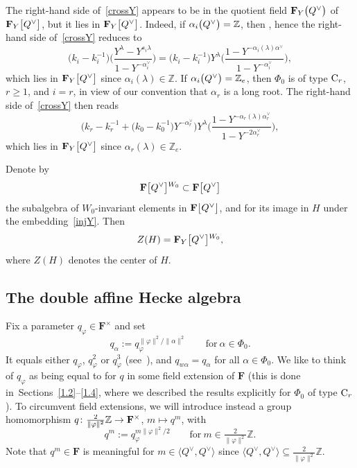 \documentclass[pdftex]{sigma}
\numberwithin{equation}{section}
\begin{document}
The right-hand side of~\eqref{crossY} appears to be in the quotient field $\mathbf{F}_Y\smash{\bigl(Q^\vee\bigr)}$ of $\mathbf{F}_Y\smash{\bigl[Q^\vee\bigr]}$, but it lies
in $\mathbf{F}_Y\smash{\bigl[Q^\vee\bigr]}$. Indeed, if $\alpha_i\smash{\bigl(Q^\vee\bigr)}=\mathbb{Z}$, then
, hence the right-hand side of~\eqref{crossY} reduces to
\[
\bigl(k_i-k_i^{-1}\bigr)\biggl(\frac{Y^\lambda-Y^{s_i\lambda}}{1-Y^{-\alpha_i^\vee}}\biggr)=
\bigl(k_i-k_i^{-1}\bigr)Y^\lambda\biggl(\frac{1-Y^{-\alpha_i(\lambda)\alpha^\vee}}{1-Y^{-\alpha_i^\vee}}\biggr),
\]
which lies in $\mathbf{F}_Y\smash{\bigl[Q^\vee\bigr]}$ since $\alpha_i(\lambda)\in\mathbb{Z}$. If $\alpha_i\smash{\bigl(Q^\vee\bigr)}=\mathbb{Z}_e$, then $\Phi_0$ is of type ${\rm C}_r$, $r\geq 1$,
and $i=r$, in view of our convention that $\alpha_r$ is a long root.
The right-hand side of~\eqref{crossY} then reads
\[
\bigl(k_r-k_r^{-1}+\bigl(k_0-k_0^{-1}\bigr)Y^{-\alpha_r^\vee}\bigr)Y^\lambda\biggl(\frac{1-Y^{-\alpha_r(\lambda)\alpha_r^\vee}}{1-Y^{-2\alpha_r^\vee}}\biggr),
\]
which lies in $\mathbf{F}_Y\smash{\bigl[Q^\vee\bigr]}$ since $\alpha_r(\lambda)\in \mathbb{Z}_e$.

Denote by
\[
\mathbf{F}\smash{\bigl[Q^\vee\bigr]}^{W_0}\subset\mathbf{F}\smash{\bigl[Q^\vee\bigr]}
\]
the subalgebra of $W_0$-invariant elements in $\mathbf{F}\smash{\bigl[Q^\vee\bigr]}$, and  for its image in $H$ under the embedding~\eqref{injY}. Then
\[
Z(H)=\mathbf{F}_Y\smash{\bigl[Q^\vee\bigr]}^{W_0},
\]
where $Z(H)$ denotes the center of $H$.

\subsection{The double affine Hecke algebra}\label{2.5}
Fix a parameter $q_\varphi\in\mathbf{F}^\times$ and set
\[
q_\alpha:=q_\varphi^{\|\varphi\|^2/\|\alpha\|^2}\qquad \text{for}\ \alpha\in\Phi_0.
\]
It equals either $q_\varphi$, $q_\varphi^2$ or $q_\varphi^3$ (see~\cite[Section~9.4, Table~1]{Hu}), and $q_{w\alpha}=q_\alpha$ for all $\alpha\in\Phi_0$.
We like to think of $q_\varphi$ as being equal to  for $q$ in some field extension of $\mathbf{F}$ (this is done in~Sections~\ref{1.2}--\ref{1.4}, where we described the results explicitly for $\Phi_0$ of type ${\rm C}_r$).
To circumvent field extensions, we will introduce instead a group homomorphism $q\colon \smash{\frac{2}{\|\varphi\|^2}}\mathbb{Z}\rightarrow\mathbf{F}^\times$, $m\mapsto q^m$, with
\begin{equation*}%
q^{m}:=q_\varphi^{m\|\varphi\|^2/2}\qquad \text{for}\ m\in\tfrac{2}{\|\varphi\|^2}\mathbb{Z}.
\end{equation*}
Note that $q^m\in\mathbf{F}$ is meaningful for $m\in \bigl\langle Q^\vee, Q^\vee\bigr\rangle$ since
$\bigl\langle Q^\vee, Q^\vee\bigr\rangle\subseteq\frac{2}{\|\varphi\|^2}\mathbb{Z}$.
\end{document}
